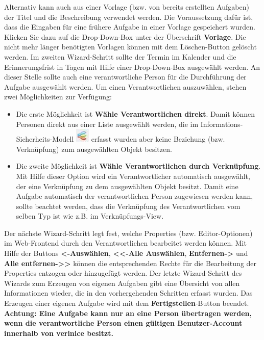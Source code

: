 \documentclass[a4paper,10pt]{book}
\begin{document}
Alternativ kann auch aus einer Vorlage (bzw. von bereits erstellten Aufgaben) der Titel und die
Beschreibung verwendet werden. Die Voraussetzung dafür ist, dass die Eingaben für eine frühere Aufgabe in einer Vorlage gespeichert wurden.
Klicken Sie dazu auf die Drop-Down-Box unter der Überschrift \textbf{Vorlage}.
Die nicht mehr länger benötigten Vorlagen können mit dem Löschen-Button gelöscht werden.
Im zweiten Wizard-Schritt sollte der Termin im Kalender und die Erinnerungsfrist in Tagen mit Hilfe einer Drop-Down-Box ausgewählt werden.
An dieser Stelle sollte auch eine verantwortliche Person
für die Durchführung der Aufgabe ausgewählt werden. Um einen Verantwortlichen auszuwählen, stehen zwei Möglichkeiten zur Verfügung:
\begin{itemize}
 \item Die erste Möglichkeit ist \textbf{Wähle Verantwortlichen direkt}. Damit können Personen direkt aus einer Liste ausgewählt werden,
die im Informations-Sicherheits-Modell \includegraphics[height=2ex]{Icon/Informationssicherheitsmodell.png} erfasst wurden aber
keine Beziehung (bzw. Verknüpfung) zum ausgewählten Objekt besitzen.
  \item Die zweite Möglichkeit ist \textbf{Wähle Verantwortlichen durch Verknüpfung}. Mit Hilfe dieser Option wird ein Verantwortlicher automatisch
ausgewählt, der eine Verknüpfung zu dem ausgewählten Objekt besitzt. Damit eine Aufgabe automatisch der verantwortlichen Person zugewiesen werden kann, sollte
beachtet werden, dass die Verknüpfung des Verantwortlichen vom selben Typ ist wie z.B. im Verknüpfungs-View.
\end{itemize}
Der nächste Wizard-Schritt legt fest, welche Properties (bzw. Editor-Optionen) im Web-Frontend durch den Verantwortlichen bearbeitet werden können. Mit Hilfe
der Buttons \textbf{\textless-Auswählen}, \textbf{\textless\textless-Alle Auswählen}, \textbf{Entfernen-\textgreater} und \textbf{Alle entfernen-\textgreater\textgreater} können die entsprechenden
Rechte für die Bearbeitung der Properties entzogen oder hinzugefügt werden.
Der letzte Wizard-Schritt des Wizards zum Erzeugen von eigenen Aufgaben gibt eine Übersicht von allen Informationen wieder, die in den vorhergehenden Schritten erfasst wurden.
Das Erzeugen einer eigenen Aufgabe wird mit dem \textbf{Fertigstellen}-Button beendet.
\newline\\
\textbf{Achtung: Eine Aufgabe kann nur an eine Person übertragen werden, wenn die verantwortliche Person einen gültigen Benutzer-Account innerhalb von verinice besitzt.}
\end{document}
